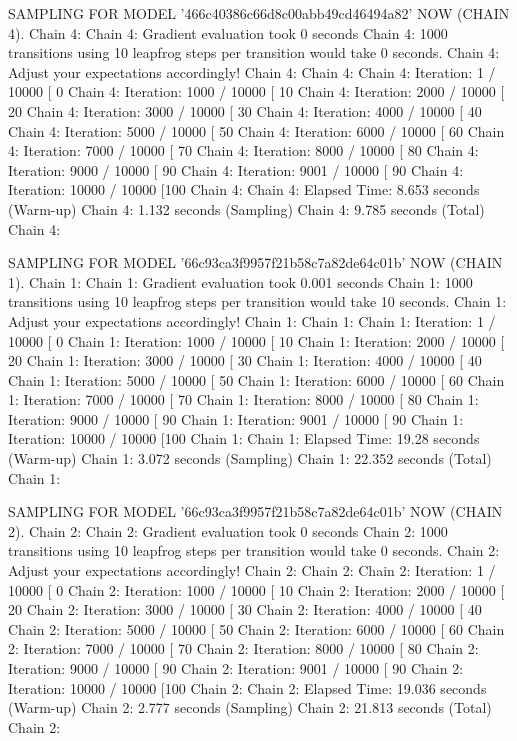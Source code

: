 \documentclass[
]{jss}
\begin{document}
\begin{CodeChunk}
\begin{CodeOutput}
SAMPLING FOR MODEL '466c40386c66d8c00abb49cd46494a82' NOW (CHAIN 4).
Chain 4: 
Chain 4: Gradient evaluation took 0 seconds
Chain 4: 1000 transitions using 10 leapfrog steps per transition would take 0 seconds.
Chain 4: Adjust your expectations accordingly!
Chain 4: 
Chain 4: 
Chain 4: Iteration:    1 / 10000 [  0%
Chain 4: Iteration: 1000 / 10000 [ 10%
Chain 4: Iteration: 2000 / 10000 [ 20%
Chain 4: Iteration: 3000 / 10000 [ 30%
Chain 4: Iteration: 4000 / 10000 [ 40%
Chain 4: Iteration: 5000 / 10000 [ 50%
Chain 4: Iteration: 6000 / 10000 [ 60%
Chain 4: Iteration: 7000 / 10000 [ 70%
Chain 4: Iteration: 8000 / 10000 [ 80%
Chain 4: Iteration: 9000 / 10000 [ 90%
Chain 4: Iteration: 9001 / 10000 [ 90%
Chain 4: Iteration: 10000 / 10000 [100%
Chain 4: 
Chain 4:  Elapsed Time: 8.653 seconds (Warm-up)
Chain 4:                1.132 seconds (Sampling)
Chain 4:                9.785 seconds (Total)
Chain 4: 

SAMPLING FOR MODEL '66c93ca3f9957f21b58c7a82de64c01b' NOW (CHAIN 1).
Chain 1: 
Chain 1: Gradient evaluation took 0.001 seconds
Chain 1: 1000 transitions using 10 leapfrog steps per transition would take 10 seconds.
Chain 1: Adjust your expectations accordingly!
Chain 1: 
Chain 1: 
Chain 1: Iteration:    1 / 10000 [  0%
Chain 1: Iteration: 1000 / 10000 [ 10%
Chain 1: Iteration: 2000 / 10000 [ 20%
Chain 1: Iteration: 3000 / 10000 [ 30%
Chain 1: Iteration: 4000 / 10000 [ 40%
Chain 1: Iteration: 5000 / 10000 [ 50%
Chain 1: Iteration: 6000 / 10000 [ 60%
Chain 1: Iteration: 7000 / 10000 [ 70%
Chain 1: Iteration: 8000 / 10000 [ 80%
Chain 1: Iteration: 9000 / 10000 [ 90%
Chain 1: Iteration: 9001 / 10000 [ 90%
Chain 1: Iteration: 10000 / 10000 [100%
Chain 1: 
Chain 1:  Elapsed Time: 19.28 seconds (Warm-up)
Chain 1:                3.072 seconds (Sampling)
Chain 1:                22.352 seconds (Total)
Chain 1: 

SAMPLING FOR MODEL '66c93ca3f9957f21b58c7a82de64c01b' NOW (CHAIN 2).
Chain 2: 
Chain 2: Gradient evaluation took 0 seconds
Chain 2: 1000 transitions using 10 leapfrog steps per transition would take 0 seconds.
Chain 2: Adjust your expectations accordingly!
Chain 2: 
Chain 2: 
Chain 2: Iteration:    1 / 10000 [  0%
Chain 2: Iteration: 1000 / 10000 [ 10%
Chain 2: Iteration: 2000 / 10000 [ 20%
Chain 2: Iteration: 3000 / 10000 [ 30%
Chain 2: Iteration: 4000 / 10000 [ 40%
Chain 2: Iteration: 5000 / 10000 [ 50%
Chain 2: Iteration: 6000 / 10000 [ 60%
Chain 2: Iteration: 7000 / 10000 [ 70%
Chain 2: Iteration: 8000 / 10000 [ 80%
Chain 2: Iteration: 9000 / 10000 [ 90%
Chain 2: Iteration: 9001 / 10000 [ 90%
Chain 2: Iteration: 10000 / 10000 [100%
Chain 2: 
Chain 2:  Elapsed Time: 19.036 seconds (Warm-up)
Chain 2:                2.777 seconds (Sampling)
Chain 2:                21.813 seconds (Total)
Chain 2: 


\end{CodeOutput}
\end{CodeChunk}
\end{document}
